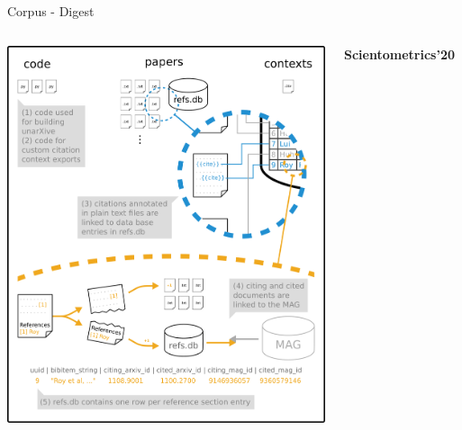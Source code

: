 \documentclass[en,16:9,smallfoot]{sdqbeamer}
\begin{document}
\begin{frame}{Corpus - Digest}
\begin{columns}
            \includegraphics[width=0.75\linewidth]{imgs/unarXive_2020_structure_with_db}
           \begin{infobox-pub-small}
           \textbf{Scientometrics'20}~\cite{Saier2020}
           \end{infobox-pub-small}
   \end{columns}
   \end{frame}

\end{document}
